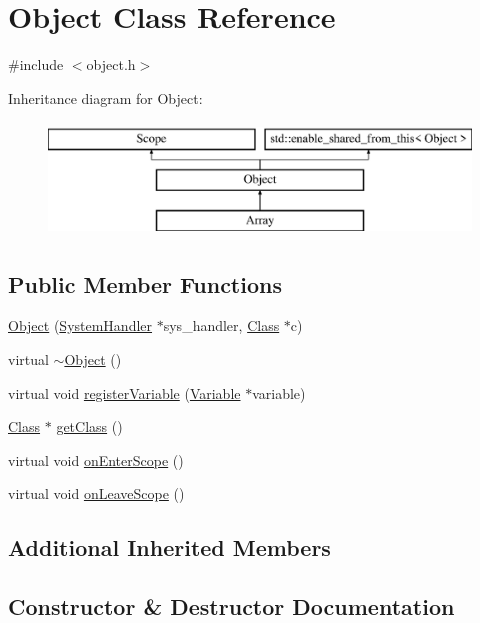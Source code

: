 \hypertarget{classObject}{}\section{Object Class Reference}
\label{classObject}


{\ttfamily \#include $<$object.\+h$>$}

Inheritance diagram for Object\+:\begin{figure}[H]
\begin{center}
\leavevmode
\includegraphics[height=3.000000cm]{classObject}
\end{center}
\end{figure}
\subsection*{Public Member Functions}
\begin{DoxyCompactItemize}
\item 
\hyperlink{classObject_a208aa5ccaeae34404f1ebacdfec66fbb}{Object} (\hyperlink{classSystemHandler}{System\+Handler} $\ast$sys\+\_\+handler, \hyperlink{classClass}{Class} $\ast$c)
\item 
virtual \hyperlink{classObject_aa3e791419d84c4c346ef9499513b8e00}{$\sim$\+Object} ()
\item 
virtual void \hyperlink{classObject_ad8f3631de109f50f94432ae9e1f7a130}{register\+Variable} (\hyperlink{classVariable}{Variable} $\ast$variable)
\item 
\hyperlink{classClass}{Class} $\ast$ \hyperlink{classObject_a51f229ad629a4ac1ad6e359a3b53941d}{get\+Class} ()
\item 
virtual void \hyperlink{classObject_a61b4cd86dd434abf07e3f4d19b5c93eb}{on\+Enter\+Scope} ()
\item 
virtual void \hyperlink{classObject_a54a99563b5936626d47fb1e2f0e13a9c}{on\+Leave\+Scope} ()
\end{DoxyCompactItemize}
\subsection*{Additional Inherited Members}


\subsection{Constructor \& Destructor Documentation}
\mbox{\label{classObject_a208aa5ccaeae34404f1ebacdfec66fbb}} 
